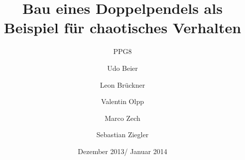 
%


\title{Bau eines Doppelpendels als Beispiel für chaotisches Verhalten}
\subtitle{PPG8}
\date{Dezember 2013/ Januar 2014}
\author{Udo Beier \and Leon Brückner \and Valentin Olpp \and Marco Zech \and Sebastian Ziegler}
\maketitle
\tableofcontents
\listoffigures
\listoftables
\newpage






\newpage
%
%


